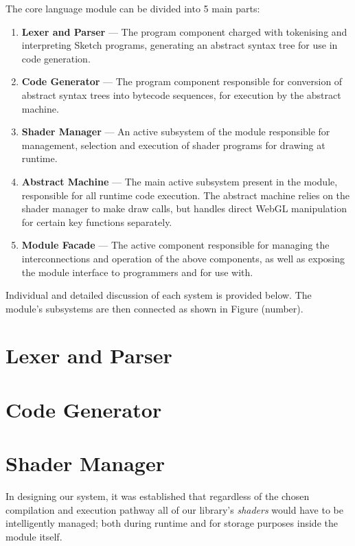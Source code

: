 \documentclass{l3proj}
\begin{document}
The core language module can be divided into 5 main parts:
\begin{enumerate}
\item \textbf{Lexer and Parser} --- The program component charged with tokenising and interpreting Sketch programs, generating an abstract syntax tree for use in code generation.
\item \textbf{Code Generator} --- The program component responsible for conversion of abstract syntax trees into bytecode sequences, for execution by the abstract machine.
\item \textbf{Shader Manager} --- An active subsystem of the module responsible for management, selection and execution of shader programs for drawing at runtime.
\item \textbf{Abstract Machine} --- The main active subsystem present in the module, responsible for all runtime code execution. The abstract machine relies on the shader manager to make draw calls, but handles direct WebGL manipulation for certain key functions separately.
\item \textbf{Module Facade} --- The active component responsible for managing the interconnections and operation of the above components, as well as exposing the module interface to programmers and for use with.
\end{enumerate}
Individual and detailed discussion of each system is provided below. The module's subsystems are then connected as shown in Figure (number).

\section{Lexer and Parser}
\label{arch-lex}

\section{Code Generator}
\label{arch-gen}

\section{Shader Manager}
\label{arch-shad}

In designing our system, it was established that regardless of the chosen compilation and execution pathway all of our library's \textit{shaders} would have to be intelligently managed; both during runtime and for storage purposes inside the module itself.
\end{document}
